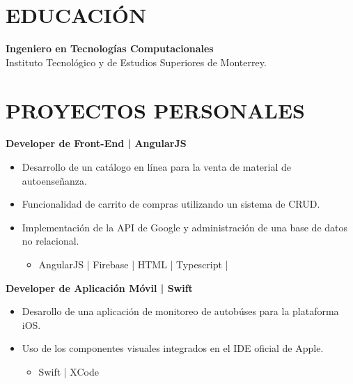 \documentclass{res}
\begin{document}
\address{
}

\begin{resume}
    \separator

    \section{\large{EDUCACIÓN}} \jump\jump
    \textbf{Ingeniero en Tecnologías Computacionales} \jump
     \\
    Instituto Tecnológico y de Estudios Superiores de Monterrey.
    
    \longjump

    \section{\large{PROYECTOS PERSONALES}} \jump\jump
    \textbf{Developer de Front-End | AngularJS} \jump
    \begin{itemize}
        \item Desarrollo de un catálogo en línea para la venta de material de autoenseñanza.
        \item Funcionalidad de carrito de compras utilizando un sistema de CRUD.
        \item Implementación de la API de Google y administración de una base de datos no relacional.
        \begin{itemize}
            \item AngularJS | Firebase | HTML | Typescript |
        \end{itemize}
    \end{itemize}
    
    \textbf{Developer de Aplicación Móvil | Swift} \jump
    \begin{itemize}
        \item Desarollo de una aplicación de monitoreo de autobúses para la plataforma iOS.
        \item Uso de los componentes visuales integrados en el IDE oficial de Apple.
        \begin{itemize}
            \item Swift | XCode 
        \end{itemize}
    \end{itemize}


\end{resume}
\end{document}
